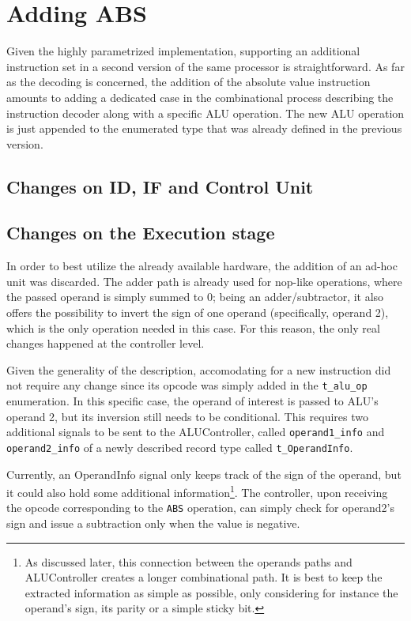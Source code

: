 \section{Adding ABS}
\label{sec:adding-abs}
Given the highly parametrized implementation, supporting an additional instruction set in a second version of the same processor is straightforward. As far as the decoding is concerned, the addition of the absolute value instruction amounts to adding a dedicated case in the combinational process describing the instruction decoder along with a specific ALU operation. The new ALU operation is just appended to the enumerated type that was already defined in the previous version.
\subsection{Changes on ID, IF and Control Unit}

\subsection{Changes on the Execution stage}
In order to best utilize the already available hardware, the addition of an ad-hoc unit was discarded. The adder path
is already used for nop-like operations, where the passed operand is simply summed to 0; being an adder/subtractor,
it also offers the possibility to invert the sign of one operand (specifically, operand 2), which is the only operation
needed in this case. For this reason, the only real changes happened at the controller level.

Given the generality of the description, accomodating for a new instruction did not require any change since its opcode
was simply added in the \texttt{t\_alu\_op} enumeration. In this specific case, the operand of interest is passed to
ALU's operand 2, but its inversion still needs to be conditional. This requires two additional signals to be sent to the
ALUController, called \texttt{operand1\_info} and \texttt{operand2\_info} of a newly described record type called
\texttt{t\_OperandInfo}.

Currently, an OperandInfo signal only keeps track of the sign of the operand, but it could also hold some additional
information\footnote{As discussed later, this connection between the operands paths and ALUController creates a longer
combinational path. It is best to keep the extracted information as simple as possible, only considering for instance
the operand's sign, its parity or a simple sticky bit.}. The controller, upon receiving the opcode corresponding to the
\texttt{ABS} operation, can simply check for operand2's sign and issue a subtraction only when the value is negative.

